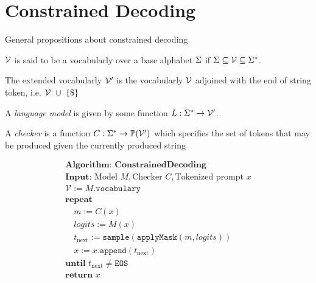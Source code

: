 
\section{Constrained Decoding}
General propositions about constrained decoding


\begin{definition}[Vocabulary]
    \label{def:Vocabulary}
    $\mathcal{V}$ is said to be a vocabularly over a base alphabet $\Sigma$ if $\Sigma \subseteq \mathcal{V} \subseteq\Sigma^{*}$.
\end{definition}

\begin{definition}
    \label{def:XVocabulary}
    The extended vocabularly $\mathcal{V'}$ is the vocabularly $\mathcal{V}$ adjoined with the end of string token, i.e. $\vocab \ \cup \ \{\$\}$
\end{definition}

\begin{definition}
    \label{def:LanguageModel}
    
    A \emph{language model} is given by some function $L: \Sigma^{*} \to \mathcal{V'}$.
\end{definition}

\begin{definition}[Checker]
    \label{def:Checker}
    A \emph{checker} is a function $C: \Sigma^* \to \mathbb{P}(\mathcal{V'})$ which specifies the set of tokens that may be produced given the currently produced string
\end{definition}

\begin{definition}
    \label{def:ConstrainedDecoding}
    \[
    \begin{array}{l}
    \textbf{Algorithm: ConstrainedDecoding} \\
    \textbf{Input: } \text{Model } M, \text{Checker } C, \text{Tokenized prompt } x \\
    \mathcal{V} := M.\texttt{vocabulary} \\
    \textbf{repeat} \\
    \quad m := C(x) \\
    \quad \textit{logits} := M(x) \\
    \quad t_{\text{next}} := \texttt{sample}(\texttt{applyMask}(m, \textit{logits})) \\
    \quad x := x.\texttt{append}(t_{\text{next}}) \\
    \textbf{until } t_{\text{next}} \ne \texttt{EOS} \\
    \textbf{return } x \\
    \end{array}
    \]
\end{definition}



